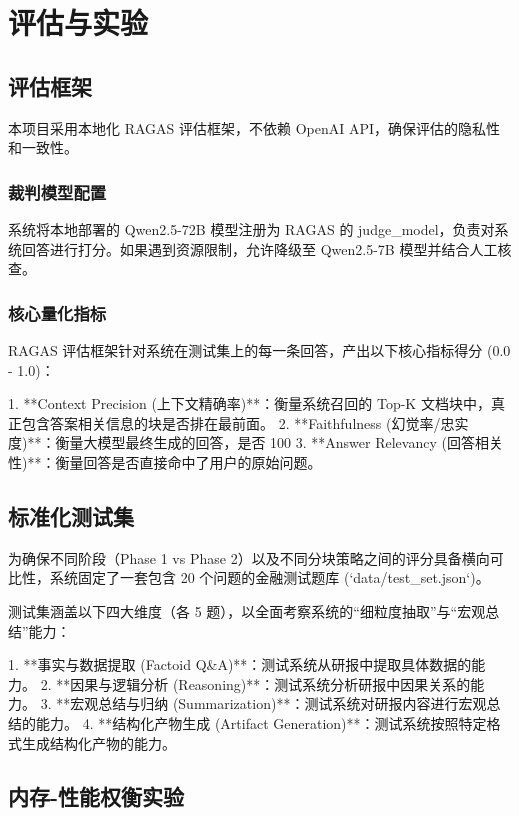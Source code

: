 \section{评估与实验}

\subsection{评估框架}

本项目采用本地化 RAGAS 评估框架，不依赖 OpenAI API，确保评估的隐私性和一致性。

\subsubsection{裁判模型配置}

系统将本地部署的 Qwen2.5-72B 模型注册为 RAGAS 的 judge_model，负责对系统回答进行打分。如果遇到资源限制，允许降级至 Qwen2.5-7B 模型并结合人工核查。

\subsubsection{核心量化指标}

RAGAS 评估框架针对系统在测试集上的每一条回答，产出以下核心指标得分 (0.0 - 1.0)：

1. **Context Precision (上下文精确率)**：衡量系统召回的 Top-K 文档块中，真正包含答案相关信息的块是否排在最前面。
2. **Faithfulness (幻觉率/忠实度)**：衡量大模型最终生成的回答，是否 100%
3. **Answer Relevancy (回答相关性)**：衡量回答是否直接命中了用户的原始问题。

\subsection{标准化测试集}

为确保不同阶段（Phase 1 vs Phase 2）以及不同分块策略之间的评分具备横向可比性，系统固定了一套包含 20 个问题的金融测试题库 (`data/test_set.json`)。

测试集涵盖以下四大维度（各 5 题），以全面考察系统的“细粒度抽取”与“宏观总结”能力：

1. **事实与数据提取 (Factoid Q\&A)**：测试系统从研报中提取具体数据的能力。
2. **因果与逻辑分析 (Reasoning)**：测试系统分析研报中因果关系的能力。
3. **宏观总结与归纳 (Summarization)**：测试系统对研报内容进行宏观总结的能力。
4. **结构化产物生成 (Artifact Generation)**：测试系统按照特定格式生成结构化产物的能力。

\subsection{内存-性能权衡实验}

